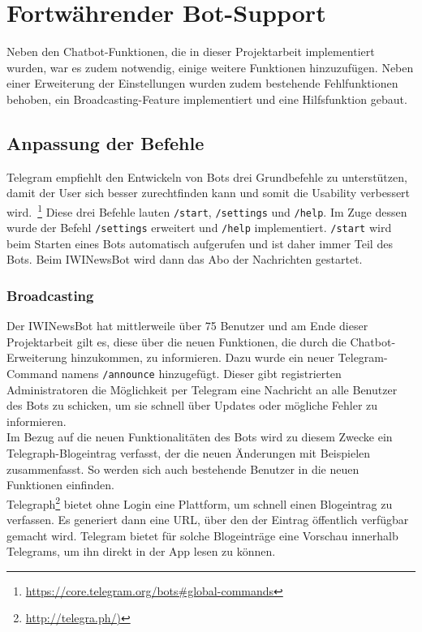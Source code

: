 \chapter{Fortwährender Bot-Support}
Neben den Chatbot-Funktionen, die in dieser Projektarbeit implementiert wurden, war es zudem notwendig, einige weitere Funktionen hinzuzufügen. Neben einer Erweiterung der Einstellungen wurden zudem bestehende Fehlfunktionen behoben, ein Broadcasting-Feature implementiert und eine Hilfsfunktion gebaut.

\section{Anpassung der Befehle}\label{sec:commands}
Telegram empfiehlt den Entwickeln von Bots drei Grundbefehle zu unterstützen, damit der User sich besser zurechtfinden kann und somit die Usability verbessert wird.~\footnote{\url{https://core.telegram.org/bots\#global-commands}}
Diese drei Befehle lauten \texttt{/start}, \texttt{/settings} und \texttt{/help}. Im Zuge dessen wurde der Befehl \texttt{/settings} erweitert und \texttt{/help} implementiert. \texttt{/start} wird beim Starten eines Bots automatisch aufgerufen und ist daher immer Teil des Bots. Beim IWINewsBot wird dann das Abo der Nachrichten gestartet.

\subsection{Broadcasting}
Der IWINewsBot hat mittlerweile über 75 Benutzer und am Ende dieser Projektarbeit gilt es, diese über die neuen Funktionen, die durch die Chatbot-Erweiterung hinzukommen, zu informieren. Dazu wurde ein neuer Telegram-Command namens \texttt{/announce} hinzugefügt. Dieser gibt registrierten Administratoren die Möglichkeit per Telegram eine Nachricht an alle Benutzer des Bots zu schicken, um sie schnell über Updates oder mögliche Fehler zu informieren. \\
Im Bezug auf die neuen Funktionalitäten des Bots wird zu diesem Zwecke ein Telegraph-Blogeintrag verfasst, der die neuen Änderungen mit Beispielen zusammenfasst. So werden sich auch bestehende Benutzer in die neuen Funktionen einfinden. \\
Telegraph\footnote{\url{http://telegra.ph/)}} bietet ohne Login eine Plattform, um schnell einen Blogeintrag zu verfassen. Es generiert dann eine URL, über den der Eintrag öffentlich verfügbar gemacht wird. Telegram bietet für solche Blogeinträge eine Vorschau innerhalb Telegrams, um ihn direkt in der App lesen zu können.

